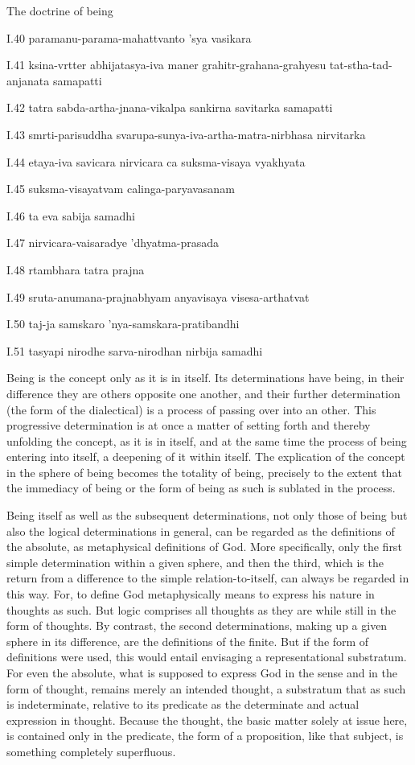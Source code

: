 
The doctrine of being

I.40
paramanu-parama-mahattvanto 'sya vasikara

I.41
ksina-vrtter abhijatasya-iva maner
grahitr-grahana-grahyesu tat-stha-tad-anjanata samapatti

I.42
tatra sabda-artha-jnana-vikalpa sankirna savitarka samapatti

I.43
smrti-parisuddha svarupa-sunya-iva-artha-matra-nirbhasa nirvitarka

I.44
etaya-iva savicara nirvicara ca suksma-visaya vyakhyata

I.45
suksma-visayatvam calinga-paryavasanam

I.46
ta eva sabija samadhi

I.47
nirvicara-vaisaradye 'dhyatma-prasada

I.48
rtambhara tatra prajna

I.49
sruta-anumana-prajnabhyam anyavisaya visesa-arthatvat

I.50
taj-ja samskaro 'nya-samskara-pratibandhi

I.51
tasyapi nirodhe sarva-nirodhan nirbija samadhi

Being is the concept only as it is in itself.
Its determinations have being,
in their difference they are
others opposite one another,
and their further determination
(the form of the dialectical)
is a process of passing over into an other.
This progressive determination is
at once a matter of setting forth
and thereby unfolding the concept,
as it is in itself, and at the same time
the process of being entering into itself,
a deepening of it within itself.
The explication of the concept
in the sphere of being
becomes the totality of being,
precisely to the extent that
the immediacy of being
or the form of being as such
is sublated in the process.

Being itself as well as the subsequent determinations,
not only those of being but also the
logical determinations in general,
can be regarded as the definitions of the absolute,
as metaphysical definitions of God.
More specifically, only the first simple
determination within a given sphere,
and then the third, which is the return
from a difference to the simple relation-to-itself,
can always be regarded in this way.
For, to define God metaphysically means
to express his nature in thoughts as such.
But logic comprises all thoughts as they are
while still in the form of thoughts.
By contrast, the second determinations,
making up a given sphere in its difference,
are the definitions of the finite.
But if the form of definitions were used,
this would entail envisaging a representational substratum.
For even the absolute, what is supposed to express God
in the sense and in the form of thought,
remains merely an intended thought,
a substratum that as such is indeterminate,
relative to its predicate as the determinate
and actual expression in thought.
Because the thought, the basic matter solely at issue here,
is contained only in the predicate,
the form of a proposition, like that subject,
is something completely superfluous.

